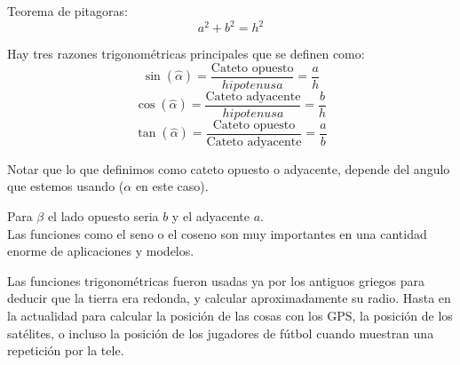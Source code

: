 \documentclass[a4paper,11pt,spanish,sans]{exam}
\begin{document}
\begin{minipage}{0.45\linewidth}


\end{minipage}
\begin{minipage}{0.5\linewidth}
Teorema de pitagoras:
\[
a^2+b^2=h^2
\]

Hay tres razones trigonométricas principales que se definen como: %
\[
\sin(\hat{\alpha})=\frac{\text{Cateto opuesto}}{hipotenusa}= \frac{a}{h}\]
\[
\cos(\hat{\alpha})=\frac{\text{Cateto adyacente}}{hipotenusa}=\frac{b}{h}
\]
\[
\tan(\hat{\alpha})=\frac{\text{Cateto opuesto}}{\text{Cateto adyacente}}=\frac{a}{b}
\]
\end{minipage}

Notar que lo que definimos como cateto opuesto o adyacente, depende del angulo que estemos usando ($\alpha$ en este caso).

Para $\beta$ el lado opuesto seria $b$ y el adyacente $a$.\\

Las funciones como el seno o el coseno son muy importantes en una cantidad enorme de aplicaciones y modelos.

Las funciones trigonométricas fueron usadas ya por los antiguos griegos para deducir que la tierra era redonda, y calcular aproximadamente su radio. 
Hasta en la actualidad para calcular la posición de las cosas con los GPS, la posición de los satélites, o incluso la posición de los jugadores de fútbol cuando muestran una repetición por la tele.
\end{document}

